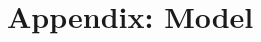 \documentclass[10pt,letterpaper]{article}
\newcommand{\w}[1]{\emph{#1}}
\newcommand{\todo}[1]{{\color{red}#1}}
\begin{document}





\appendix
\section{\\Appendix: Model} \label{model}
\end{document}
